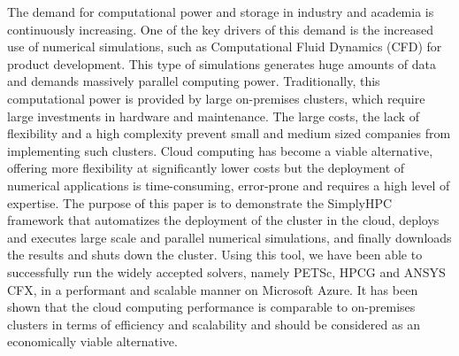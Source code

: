 The demand for computational power and storage in industry and academia is continuously increasing. One of the key drivers of this demand is the increased use of numerical simulations, such as Computational Fluid Dynamics (CFD) for product development. This type of simulations generates huge amounts of data and demands massively parallel computing power. Traditionally, this computational power is provided by large on-premises clusters, which require large investments in hardware and maintenance. The large costs, the lack of flexibility and a high complexity prevent small and medium sized companies from implementing such clusters. Cloud computing has become a viable alternative, offering more flexibility at significantly lower costs but the deployment of numerical applications is time-consuming, error-prone and requires a high level of expertise. The purpose of this paper is to demonstrate the SimplyHPC framework that automatizes the deployment of the cluster in the cloud, deploys and executes large scale and parallel numerical simulations, and finally downloads the results and shuts down the cluster. Using this tool, we have been able to successfully run the widely accepted solvers, namely PETSc, HPCG and ANSYS CFX, in a performant and scalable manner on Microsoft Azure. It has been shown that the cloud computing performance is comparable to on-premises clusters in terms of efficiency and scalability and should be considered as an economically viable alternative. 
